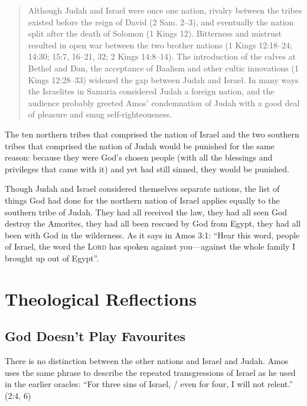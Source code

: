 \begin{quote}
    Although Judah and Israel were once one nation, rivalry between the tribes
    existed before the reign of David (2 Sam. 2--3), and eventually the nation
    split after the death of Solomon (1 Kings 12). Bitterness and mistrust
    resulted in open war between the two brother nations (1 Kings 12:18--24;
    14:30; 15:7, 16--21, 32; 2 Kings 14:8--14). The introduction of the calves
    at Bethel and Dan, the acceptance of Baalism and other cultic innovations (1
    Kings 12:28--33) widened the gap between Judah and Israel. In many ways the
    Israelites in Samaria considered Judah a foreign nation, and the audience
    probably greeted Amos' condemnation of Judah with a good deal of pleasure
    and smug self-righteousness.
    \autocite[114]{smith:2017}
\end{quote}

The ten northern tribes that comprised the nation of Israel and the two southern
tribes that comprised the nation of Judah would be punished for the same reason:
because they were God's chosen people (with all the blessings and privileges
that came with it) and yet had still sinned, they would be punished.

Though Judah and Israel considered themselves separate nations, the list of
things God had done for the northern nation of Israel applies equally to the
southern tribe of Judah. They had all received the law, they had all seen God
destroy the Amorites, they had all been rescued by God from Egypt, they had all
been with God in the wilderness. As it says in Amos 3:1: \enquote{Hear this
word, people of Israel, the word the \textsc{Lord} has spoken against
you---against the whole family I brought up out of Egypt}.

\section{Theological Reflections}

\subsection{God Doesn't Play Favourites}

There is no distinction between the other nations and Israel and Judah. Amos
uses the same phrase to describe the repeated transgressions of Israel as he
used in the earlier oracles: \enquote{For three sins of Israel, / even for four,
I will not relent.} (2:4, 6)

